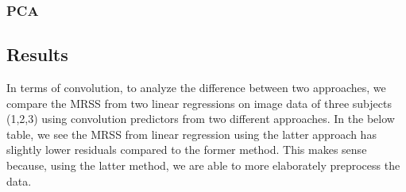 \subsubsection {PCA}

\subsection {Results}
In terms of convolution, to analyze the difference between two approaches, we compare the MRSS from two linear regressions on image data of three subjects (1,2,3) using convolution predictors from two different approaches. In the below table, we see the MRSS from linear regression using the latter approach has slightly lower residuals compared to the former method. This makes sense because, using the latter method, we are able to more elaborately preprocess the data.



